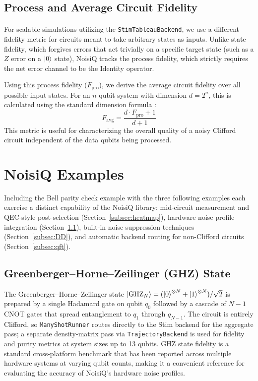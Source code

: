\documentclass[10pt,twocolumn]{article}
\begin{document}
\subsection{Process and Average Circuit Fidelity}
\label{subsec:Average_fidelity}
\paragraph{}
    For scalable simulations utilizing the \texttt{StimTableauBackend}, we use a different fidelity metric for circuits meant to take arbitrary states as inputs. 
Unlike state fidelity, which forgives errors that act trivially on a specific target state (such as a $Z$ error on a $\ket{0}$ state), 
NoisiQ tracks the process fidelity, which strictly requires the net error channel to be the Identity operator.

    Using this process fidelity ($F_{\text{pro}}$), we derive the average circuit fidelity over all possible input states. For an $n$-qubit system with dimension $d = 2^n$, 
this is calculated using the standard dimension formula \cite{nielsen2002}:
    \begin{equation}
        F_{\text{avg}} = \frac{d \cdot F_{\text{pro}} + 1}{d + 1}
    \end{equation}
    This metric is useful for characterizing the overall quality of a noisy Clifford circuit independent of the data qubits being processed.


\section{NoisiQ Examples}
\label{sec:examples}

Including the Bell parity check example with the three following examples each exercise a distinct capability of the
NoisiQ library: mid-circuit measurement and QEC-style post-selection
(Section~\ref{subsec:heatmap}), hardware noise profile integration 
(Section~\ref{subsec:GHZ}), built-in noise suppression techniques
(Section~\ref{subsec:DD}), and automatic backend routing for
non-Clifford circuits (Section~\ref{subsec:qft}).


\subsection{Greenberger–Horne–Zeilinger (GHZ) State}
\label{subsec:GHZ}

The Greenberger–Horne–Zeilinger state
$\ket{\text{GHZ}_N} = (\ket{0}^{\otimes N} + \ket{1}^{\otimes N})/\sqrt{2}$
is prepared by a single Hadamard gate on qubit $q_0$ followed by a
cascade of $N-1$ CNOT gates that spread entanglement to $q_1$ through
$q_{N-1}$.
The circuit is entirely Clifford, so \texttt{ManyShotRunner} routes
directly to the Stim backend for the aggregate pass; a separate density-matrix
pass via \texttt{TrajectoryBackend} is used for fidelity and purity
metrics at system sizes up to 13 qubits.
GHZ state fidelity is a standard cross-platform benchmark that has been
reported across multiple hardware systems at varying qubit counts, making
it a convenient reference for evaluating the accuracy of NoisiQ's
hardware noise profiles.
\end{document}

